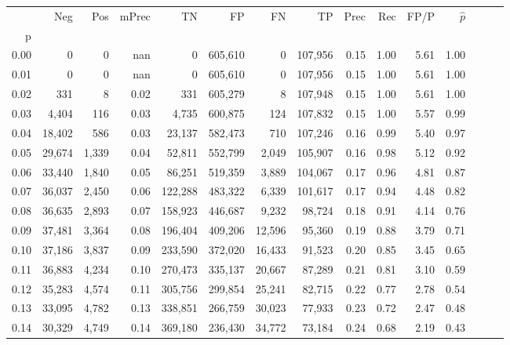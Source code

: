 \begin{tabular}{rrrrrrrrrrrrrrr}
\toprule
{} &     Neg &    Pos & mPrec &       TN &       FP &       FN &       TP &  Prec &   Rec &  FP/P & $\hat{p}$ \\
p    &         &        &       &          &          &          &          &       &       &       &           \\
\midrule
0.00 &       0 &      0 &   nan &        0 &  605,610 &        0 &  107,956 &  0.15 &  1.00 &  5.61 &      1.00 \\
0.01 &       0 &      0 &   nan &        0 &  605,610 &        0 &  107,956 &  0.15 &  1.00 &  5.61 &      1.00 \\
0.02 &     331 &      8 &  0.02 &      331 &  605,279 &        8 &  107,948 &  0.15 &  1.00 &  5.61 &      1.00 \\
0.03 &   4,404 &    116 &  0.03 &    4,735 &  600,875 &      124 &  107,832 &  0.15 &  1.00 &  5.57 &      0.99 \\
0.04 &  18,402 &    586 &  0.03 &   23,137 &  582,473 &      710 &  107,246 &  0.16 &  0.99 &  5.40 &      0.97 \\
0.05 &  29,674 &  1,339 &  0.04 &   52,811 &  552,799 &    2,049 &  105,907 &  0.16 &  0.98 &  5.12 &      0.92 \\
0.06 &  33,440 &  1,840 &  0.05 &   86,251 &  519,359 &    3,889 &  104,067 &  0.17 &  0.96 &  4.81 &      0.87 \\
0.07 &  36,037 &  2,450 &  0.06 &  122,288 &  483,322 &    6,339 &  101,617 &  0.17 &  0.94 &  4.48 &      0.82 \\
0.08 &  36,635 &  2,893 &  0.07 &  158,923 &  446,687 &    9,232 &   98,724 &  0.18 &  0.91 &  4.14 &      0.76 \\
0.09 &  37,481 &  3,364 &  0.08 &  196,404 &  409,206 &   12,596 &   95,360 &  0.19 &  0.88 &  3.79 &      0.71 \\
0.10 &  37,186 &  3,837 &  0.09 &  233,590 &  372,020 &   16,433 &   91,523 &  0.20 &  0.85 &  3.45 &      0.65 \\
0.11 &  36,883 &  4,234 &  0.10 &  270,473 &  335,137 &   20,667 &   87,289 &  0.21 &  0.81 &  3.10 &      0.59 \\
0.12 &  35,283 &  4,574 &  0.11 &  305,756 &  299,854 &   25,241 &   82,715 &  0.22 &  0.77 &  2.78 &      0.54 \\
0.13 &  33,095 &  4,782 &  0.13 &  338,851 &  266,759 &   30,023 &   77,933 &  0.23 &  0.72 &  2.47 &      0.48 \\
0.14 &  30,329 &  4,749 &  0.14 &  369,180 &  236,430 &   34,772 &   73,184 &  0.24 &  0.68 &  2.19 &      0.43 \\

\end{tabular}
